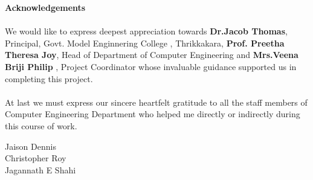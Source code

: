 \documentclass[11pt]{report}
\begin{document}
\begin{center}
	\thispagestyle{empty}
	\LARGE{\textbf{Acknowledgements}}\\[1cm]
\end{center}
\linespread{1.13}
\large{\paragraph{}We would like to express deepest appreciation towards \textbf{Dr.Jacob Thomas},
	Principal, Govt. Model Enginnering College , Thrikkakara, \textbf{Prof. Preetha Theresa Joy}, 
	Head of Department of Computer Engineering and \textbf{Mrs.Veena Briji Philip }, Project Coordinator whose
	invaluable guidance supported us in completing this project.}
\large{\paragraph{}At last we must express our sincere heartfelt gratitude to all the staff members
	of Computer Engineering Department who helped me directly or indirectly during this course of work.}
\begin{flushleft}
	{
		Jaison Dennis\\
		Christopher Roy\\
		Jagannath E Shahi
	}
\end{flushleft}
\newpage
 
\begin{abstract}
This project 'E-Mart' is an e-commerce platform  which sells its goods and services online making it easier for the user to access a wide variety of items from a single platform. E-Mart allows customers to browse and purchase products from a variety of sellers through a web browser. The platform handles all aspects of the transaction, including payment processing, order fulfillment, and order tracking. The platform may also offer features such as personalized recommendations, wish lists, and reviews to help customers find the products they are looking for. Users can also add products to cart and buy them at a later time. Users can search and filter products based on price, brand and offers. Our platform is open for both end users and sellers. The goal of the platform is to create a convenient and easy-to-use shopping experience for customers, while also providing a means for sellers to reach a larger audience and grow their businesses.
\end{abstract}
\setcounter{tocdepth}{0}
\tableofcontents
\end{document}
